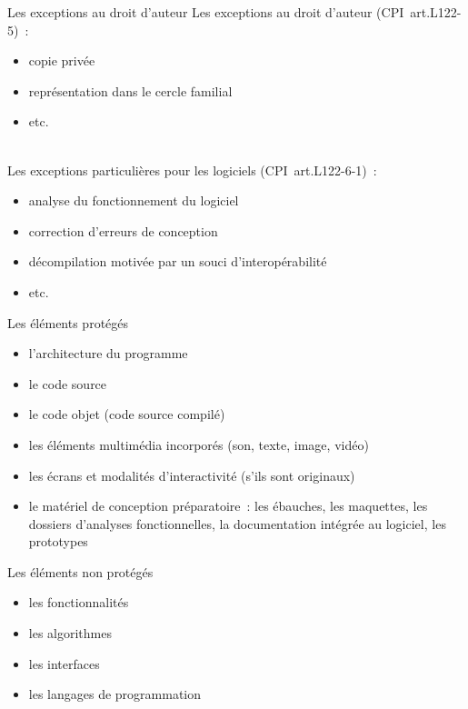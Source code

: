 \documentclass{beamer}
\begin{document}
\begin{frame}{Les exceptions au droit d'auteur}
    Les exceptions au droit d'auteur (CPI~art.L122-5)~:
    \begin{itemize}
        \item copie privée
        \item représentation dans le cercle familial
        \item etc.
    \end{itemize}
    ~\\
    Les exceptions particulières pour les logiciels (CPI~art.L122-6-1)~:
    \begin{itemize}
        \item analyse du fonctionnement du logiciel
        \item correction d'erreurs de conception
        \item décompilation motivée par un souci d'interopérabilité
        \item etc.
    \end{itemize}
\end{frame}

\begin{frame}{Les éléments protégés}
    \begin{itemize}
        \item l'architecture du programme
        \item le code source
        \item le code objet (code source compilé)
        \item les éléments multimédia incorporés (son, texte, image, vidéo)
        \item les écrans et modalités d'interactivité (s'ils sont originaux)
        \item le matériel de conception préparatoire~: les ébauches,
              les maquettes, les dossiers d'analyses fonctionnelles,
              la documentation intégrée au logiciel, les prototypes
    \end{itemize}
\end{frame}

\begin{frame}{Les éléments non protégés}
    \begin{itemize}
        \item les fonctionnalités
        \item les algorithmes
        \item les interfaces
        \item les langages de programmation
    \end{itemize}
\end{frame}
\end{document}
